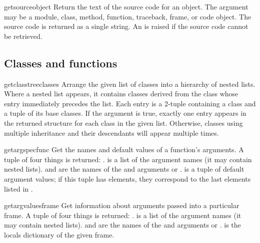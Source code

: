 \begin{funcdesc}{getsource}{object}
  Return the text of the source code for an object.
  The argument may be a module, class, method, function, traceback, frame,
  or code object.  The source code is returned as a single string.  An
   is raised if the source code cannot be retrieved.
\end{funcdesc}

\subsection{Classes and functions
            \label{inspect-classes-functions}}

\begin{funcdesc}{getclasstree}{classes}
  Arrange the given list of classes into a hierarchy of nested lists.
  Where a nested list appears, it contains classes derived from the class
  whose entry immediately precedes the list.  Each entry is a 2-tuple
  containing a class and a tuple of its base classes.  If the 
  argument is true, exactly one entry appears in the returned structure
  for each class in the given list.  Otherwise, classes using multiple
  inheritance and their descendants will appear multiple times.
\end{funcdesc}

\begin{funcdesc}{getargspec}{func}
  Get the names and default values of a function's arguments.
  A tuple of four things is returned: .
   is a list of the argument names (it may contain nested lists).
   and  are the names of the \code{*} and
  \code{**} arguments or .
   is a tuple of default argument values; if this tuple
  has  elements, they correspond to the last  elements
  listed in .
\end{funcdesc}

\begin{funcdesc}{getargvalues}{frame}
  Get information about arguments passed into a particular frame.
  A tuple of four things is returned: .
   is a list of the argument names (it may contain nested
  lists).
   and  are the names of the \code{*} and
  \code{**} arguments or .
   is the locals dictionary of the given frame.
\end{funcdesc}


